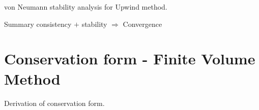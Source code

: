 \documentclass[12pt]{article}
\begin{document}
\begin{example}
	von Neumann stability analysis for Upwind method.
\end{example}

\begin{example}
	Summary consistency $+$ stability $\Rightarrow$ Convergence
\end{example}

\pagebreak
\section{Conservation form - Finite Volume Method}
\begin{example}
	Derivation of conservation form.
\end{example}


\end{document}
